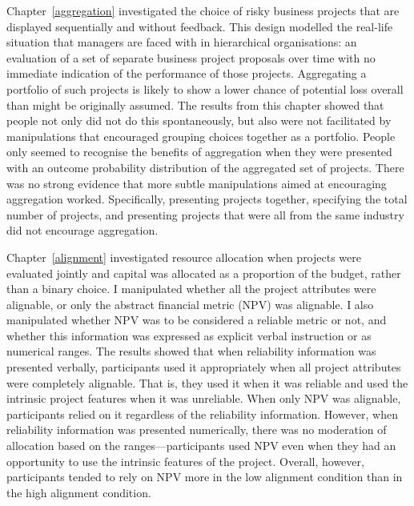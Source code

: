 \documentclass[a4paper, nobind, dvipsnames]{templates/ociamthesis}
\theoremstyle{definition}
\theoremstyle{definition}
\theoremstyle{definition}
\theoremstyle{definition}
\theoremstyle{remark}
\begin{document}
Chapter~\ref{aggregation} investigated the choice of risky business projects
that are displayed sequentially and without feedback. This design modelled the
real-life situation that managers are faced with in hierarchical organisations:
an evaluation of a set of separate business project proposals over time with no
immediate indication of the performance of those projects. Aggregating a
portfolio of such projects is likely to show a lower chance of potential loss
overall than might be originally assumed. The results from this chapter showed
that people not only did not do this spontaneously, but also were not
facilitated by manipulations that encouraged grouping choices together as a
portfolio. People only seemed to recognise the benefits of aggregation when they
were presented with an outcome probability distribution of the aggregated set of
projects. There was no strong evidence that more subtle manipulations aimed at
encouraging aggregation worked. Specifically, presenting projects together,
specifying the total number of projects, and presenting projects that were all
from the same industry did not encourage aggregation.

Chapter~\ref{alignment} investigated resource allocation when projects were
evaluated jointly and capital was allocated as a proportion of the budget,
rather than a binary choice. I manipulated whether all the project attributes
were alignable, or only the abstract financial metric (NPV) was alignable. I
also manipulated whether NPV was to be considered a reliable metric or not, and
whether this information was expressed as explicit verbal instruction or as
numerical ranges. The results showed that when reliability information was
presented verbally, participants used it appropriately when all project
attributes were completely alignable. That is, they used it when it was reliable
and used the intrinsic project features when it was unreliable. When only NPV
was alignable, participants relied on it regardless of the reliability
information. However, when reliability information was presented numerically,
there was no moderation of allocation based on the ranges---participants used
NPV even when they had an opportunity to use the intrinsic features of the
project. Overall, however, participants tended to rely on NPV more in the low
alignment condition than in the high alignment condition.
\end{document}
